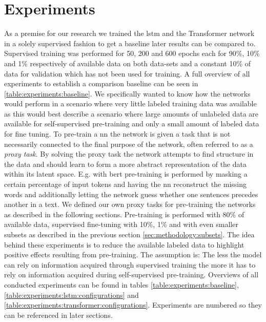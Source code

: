 \chapter{Experiments}\label{sec:experiments}


As a premise for our research we trained the \gls{lstm} and the Transformer network in a solely supervised fashion to get a baseline later results can be compared to. Supervised training was performed for 50, 200 and 600 epochs each for 90\%, 10\% and 1\% respectively of available data on both data-sets and a constant 10\% of data for validation which has not been used for training. A full overview of all experiments to establish a comparison baseline can be seen in \ref{table:experiments:baseline}. We specifically wanted to know how the networks would perform in a scenario where very little labeled training data was available as this would best describe a scenario where large amounts of unlabeled data are available for self-supervised pre-training and only a small amount of labeled data for fine tuning. To pre-train a \gls{nn} the network is given a task that is not necessarily connected to the final purpose of the network, often referred to as a \textit{proxy task}. By solving the proxy task the network attempts to find structure in the data and should learn to form a more abstract representation of the data within its latent space. E.g. with \gls{bert} pre-training is performed by masking a certain percentage of input tokens and having the \gls{nn} reconstruct the missing words and additionally letting the network guess whether one sentences precedes another in a text. We defined our own proxy tasks for pre-training the networks as described in the following sections. Pre-training is performed with 80\% of available data, supervised fine-tuning with 10\%, 1\% and with even smaller subsets as described in the previous section \ref{sec:methodology:subsets}.
The idea behind these experiments is to reduce the available labeled data to highlight positive effects resulting from pre-training. The assumption is: The less the model can rely on information acquired through supervised training the more it has to rely on information acquired during self-supervised pre-training. Overviews of all conducted experiments can be found in tables \ref{table:experiments:baseline}, \ref{table:experiments:lstm:configurations} and \ref{table:experiments:transformer:configurations}.
Experiments are numbered so they can be referenced in later sections. 

